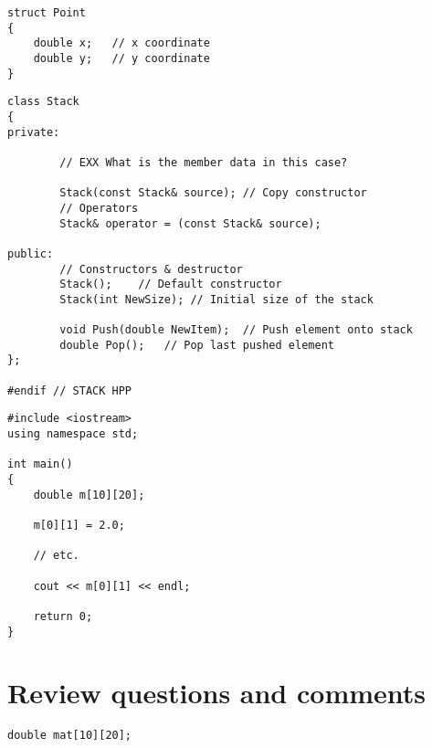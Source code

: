 \begin{lstlisting}
struct Point
{
	double x;	// x coordinate
	double y;	// y coordinate
}
\end{lstlisting}

\begin{lstlisting}
class Stack
{
private:

		// EXX What is the member data in this case?

		Stack(const Stack& source);	// Copy constructor
		// Operators
		Stack& operator = (const Stack& source);

public:
		// Constructors & destructor
		Stack();	// Default constructor
		Stack(int NewSize);	// Initial size of the stack

		void Push(double NewItem);	// Push element onto stack
		double Pop();	// Pop last pushed element
};

#endif // STACK HPP
\end{lstlisting}

\begin{lstlisting}
#include <iostream>
using namespace std;

int main()
{
	double m[10][20];

	m[0][1] = 2.0;

	// etc.

	cout << m[0][1] << endl;

	return 0;
}
\end{lstlisting}

\section{Review questions and comments}

\begin{lstlisting}
double mat[10][20];
\end{lstlisting}